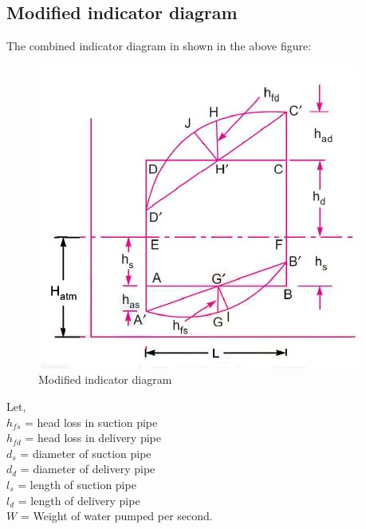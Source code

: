 \documentclass{article}
\begin{document}
\begin{multicols}{2}
      \subsection*{Modified indicator diagram}
      The combined indicator diagram in shown in the above figure: \\

      \begin{figure}[H]
        \begin{center}
          \includegraphics*[width=0.99\columnwidth]{img/modified_indicator_diagram.jpg}
          \caption{Modified indicator diagram}
        \end{center}
      \end{figure}

      Let,\\
      $h_{fs}$ = head loss in suction pipe \\
      $h_{fd}$ = head loss in delivery pipe \\
      $d_s$ = diameter of suction pipe \\
      $d_d$ = diameter of delivery pipe \\
      $l_s$ = length of suction pipe \\
      $l_d$ = length of delivery pipe \\
      $W$ = Weight of water pumped per second. \\


\end{multicols}
\end{document}
